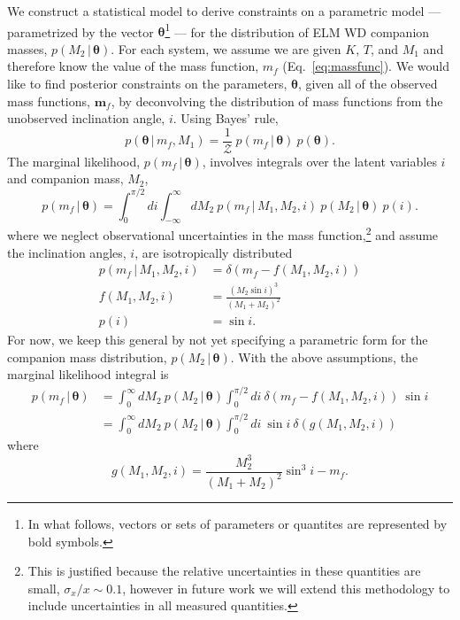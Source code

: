 \documentclass[letterpaper,12pt,preprint]{aastex}
\newcommand{\given}{\,|\,}
\newcommand{\bs}[1]{\boldsymbol{#1}}
\begin{document}
We construct a statistical model to derive constraints on a parametric model --- parametrized by the vector $\bs{\theta}$\footnote{In what follows, vectors or sets of parameters or quantites are represented by bold symbols.} --- for the distribution of ELM WD companion masses, $p(M_2 \given \bs{\theta})$. For each system, we assume we are given $K$, $T$, and $M_1$ and therefore know the value of the mass function, $m_f$ (Eq.~\ref{eq:massfunc}). We would like to find posterior constraints on the parameters, $\boldsymbol{\theta}$, given all of the observed mass functions, $\bs{m}_f$, by deconvolving the distribution of mass functions from the unobserved inclination angle, $i$. Using Bayes' rule,
\begin{equation}
    p(\bs{\theta} \given m_f, M_1) = \frac{1}{\mathcal{Z}}~p(m_f \given \bs{\theta})~p(\bs{\theta}).
\end{equation}
The marginal likelihood, $p(m_f \given \bs{\theta})$, involves integrals over the latent variables $i$ and companion mass, $M_2$,
\begin{equation}
    p(m_f \given \bs{\theta}) = \int_0^{\pi/2} di \int_{-\infty}^\infty dM_2~p(m_f \given M_1, M_2, i)~p(M_2 \given \bs{\theta})~p(i).
\end{equation}
where we neglect observational uncertainties in the mass function,\footnote{This is justified because the relative uncertainties in these quantities are small, $\sigma_x / x \sim 0.1$, however in future work we will extend this methodology to include uncertainties in all measured quantities.} and assume the inclination angles, $i$, are isotropically distributed
\begin{align}
	p(m_f \given M_1, M_2, i) &= \delta(m_f - f(M_1, M_2, i))\\
	f(M_1, M_2, i) &= \frac{(M_2 \sin i)^3}{(M_1 + M_2)^2}\\
	p(i) &= \sin i.
\end{align}
For now, we keep this general by not yet specifying a parametric form for the companion mass distribution, $p(M_2 \given \bs{\theta})$. With the above assumptions, the marginal likelihood integral is
\begin{align}
    p(m_f \given \bs{\theta}) &= \int_{0}^\infty dM_2~p(M_2 \given \bs{\theta}) \int_0^{\pi/2} di ~ \delta(m_f - f(M_1, M_2, i))~\sin i\\
    &= \int_{0}^\infty dM_2~p(M_2 \given \bs{\theta}) \int_0^{\pi/2} di ~\sin i ~ \delta(g(M_1,M_2,i))\label{eq:delta}
\end{align}
where
\begin{equation}
	g(M_1,M_2,i) = \frac{M_2^3}{(M_1+M_2)^2}\sin^3 i - m_f.
\end{equation}
\end{document}
